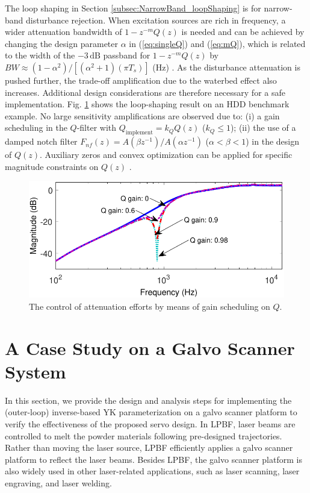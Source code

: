 \documentclass [11pt, proquest] {uwthesis}[2020/02/24]
\begin{document}
The loop shaping in Section \ref{subsec:NarrowBand_loopShaping} is
for narrow-band disturbance rejection. When excitation sources are
rich in frequency, a wider attenuation bandwidth of $1-z^{-m}Q(z)$
is needed and can be achieved by changing the design parameter $\alpha$
in (\ref{eq:singleQ}) and (\ref{eq:mQ}), which is related to the
width of the $-3\,\text{dB}$ passband for $1-z^{-m}Q(z)$ by $BW\approx(1-\alpha^{2})/[(\alpha^{2}+1)(\pi T_{s})]$
(Hz) \cite{chen2013inverse}. As the disturbance attenuation is pushed
further, the trade-off amplification due to the waterbed effect also
increases. Additional design considerations are therefore necessary
for a safe implementation. Fig. \ref{fig:The-control-of} shows the
loop-shaping result on an HDD benchmark example. No large sensitivity
amplifications are observed due to: (i) a gain scheduling in the $Q$-filter
with $Q_{\text{implement}}=k_{Q}Q(z)$ ($k_{Q}\leq1$); (ii) the use
of a damped notch filter $F_{nf}(z)=A(\beta z^{-1})/A(\alpha z^{-1})$
($\alpha<\beta<1$) in the design of $Q(z)$. Auxiliary zeros and
convex optimization can be applied for specific magnitude constraints
on $Q(z)$ \cite{chen2014optimal}.
\begin{figure}[!ht]
\begin{centering}
\includegraphics[width=12cm]{Loop-shaping/bandlimited_bode_S_Qgian_scheduling}
\par\end{centering}
\caption{\label{fig:The-control-of}The control of attenuation efforts by means
of gain scheduling on $Q$.}
\end{figure}

\section{A Case Study on a Galvo Scanner System} \label{sec:A-Case-Study-on-a-Galvo-Scanner-System}

\label{sec:A-case-study} In this section, we provide the design and
analysis steps for implementing the (outer-loop) inverse-based YK
parameterization on a galvo scanner platform to verify the effectiveness
of the proposed servo design. In LPBF, laser beams are controlled to melt the powder materials
following pre-designed trajectories. Rather than moving the laser
source, LPBF efficiently applies a galvo scanner platform to reflect
the laser beams. Besides LPBF, the galvo scanner platform is also widely
used in other laser-related applications, such as laser scanning, laser
engraving, and laser welding.
\end{document}
